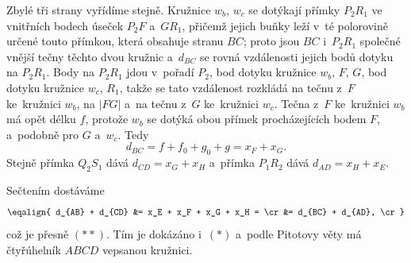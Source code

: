 {    Zbylé tři strany vyřídíme stejně. Kružnice $w_b$, $w_c$ se dotýkají přímky $P_2R_1$ ve vnitřních bodech úseček $P_2F$ a~$GR_1$, přičemž jejich buňky leží v~té polorovině určené touto přímkou, která obsahuje stranu $BC$; proto jsou $BC$ i~$P_2R_1$ společné vnější tečny těchto dvou kružnic a~$d_{BC}$ se rovná vzdálenosti jejich bodů dotyku na $P_2R_1$. Body na $P_2R_1$ jdou v~pořadí $P_2$, bod dotyku kružnice $w_b$, $F$, $G$, bod dotyku kružnice $w_c$, $R_1$, takže se tato vzdálenost rozkládá na tečnu z~$F$ ke~kružnici $w_b$, na $|FG|$ a~na tečnu z~$G$ ke~kružnici $w_c$. Tečna z~$F$ ke~kružnici $w_b$ má opět délku $f$, protože $w_b$ se dotýká obou přímek procházejících bodem $F$, a~podobně pro $G$ a~$w_c$. Tedy
    $$
    d_{BC} = f + f_0 + g_0 + g = x_F + x_G.
    $$
    Stejně přímka $Q_2S_1$ dává $d_{CD} = x_G + x_H$ a~přímka $P_1R_2$ dává $d_{AD} = x_H + x_E$.

    Sečtením dostáváme
    $$
    \eqalign{
    d_{AB} + d_{CD} &= x_E + x_F + x_G + x_H = \cr
    &= d_{BC} + d_{AD}, \cr
    }
    $$
    což je přesně $(**)$. Tím je dokázáno i~$(*)$ a~podle Pitotovy věty má čtyřúhelník $ABCD$ vepsanou kružnici.
}

